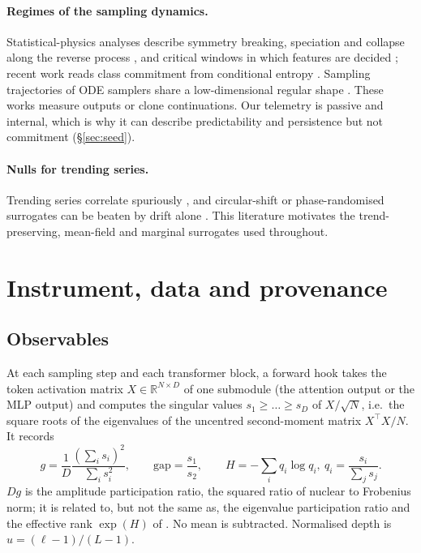 \documentclass[11pt]{article}
\newcommand{\gap}{\mathrm{gap}}
\begin{document}
\paragraph{Regimes of the sampling dynamics.} Statistical-physics analyses describe symmetry breaking, speciation and collapse along the reverse process \citep{raya2023spontaneous,biroli2023generative,biroli2024dynamical,sclocchi2025phase}, and critical windows in which features are decided \citep{li2024critical}; recent work reads class commitment from conditional entropy \citep{handke2026entropic}. Sampling trajectories of ODE samplers share a low-dimensional regular shape \citep{chen2024trajectory}. These works measure outputs or clone continuations. Our telemetry is passive and internal, which is why it can describe predictability and persistence but not commitment (\S\ref{sec:seed}).

\paragraph{Nulls for trending series.} Trending series correlate spuriously \citep{yule1926why,granger1974spurious}, and circular-shift or phase-randomised surrogates can be beaten by drift alone \citep{theiler1992testing,schreiber2000surrogate,harris2020nonsense}. This literature motivates the trend-preserving, mean-field and marginal surrogates used throughout.

\section{Instrument, data and provenance}\label{sec:instrument}

\subsection{Observables}
At each sampling step and each transformer block, a forward hook takes the token activation matrix $X\in\mathbb{R}^{N\times D}$ of one submodule (the attention output or the MLP output) and computes the singular values $s_1\ge\dots\ge s_D$ of $X/\sqrt N$, i.e.\ the square roots of the eigenvalues of the uncentred second-moment matrix $X^\top X/N$. It records
\begin{equation}
 g=\frac{1}{D}\frac{(\sum_is_i)^2}{\sum_is_i^2},\qquad \gap=\frac{s_1}{s_2},\qquad H=-\sum_iq_i\log q_i,\ q_i=\frac{s_i}{\sum_js_j}.
\end{equation}
$Dg$ is the amplitude participation ratio, the squared ratio of nuclear to Frobenius norm; it is related to, but not the same as, the eigenvalue participation ratio \citep{gao2017theory} and the effective rank $\exp(H)$ of \citet{roy2007effective}. No mean is subtracted. Normalised depth is $u=(\ell-1)/(L-1)$.
\end{document}
